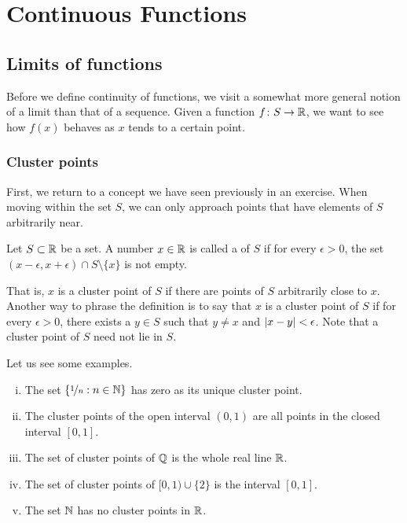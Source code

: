 \chapter{Continuous Functions} \label{lim:chapter}


\section{Limits of functions}
\label{sec:limoffunc}



Before we define continuity of functions, we visit a somewhat
more general notion of a limit than that of a sequence.
Given a function $f \colon S \to
{\mathbb{R}}$, we want to see how $f(x)$ behaves as $x$ tends to a certain point.

\subsection{Cluster points}

First,
we return to a concept we have seen previously in an exercise.
When moving within the set $S$, we can only approach points
that have elements of $S$ arbitrarily near.

\begin{defn}
Let $S \subset {\mathbb{R}}$ be a set.  A number $x \in {\mathbb{R}}$ is called
a \emph{} of $S$
if for every $\epsilon > 0$, the set $(x-\epsilon,x+\epsilon) \cap S
\setminus \{ x \}$ is not empty.
\end{defn}

That is, $x$ is a cluster point of $S$ if there are points of $S$
arbitrarily close to $x$.  Another way to phrase the definition is to say
that $x$ is a cluster point of $S$ if for every $\epsilon > 0$, there
exists a $y \in S$ such that $y \neq x$ and $\lvert {x - y} \rvert < \epsilon$.
Note that a cluster point of $S$ need not lie in $S$.

Let us see some examples.
\begin{enumerate}[(i)]
\item The set
$\{ \nicefrac{1}{n} : n \in {\mathbb{N}} \}$ has zero as its unique cluster point.
\item The cluster points of the open interval $(0,1)$ are
all points in the closed interval $[0,1]$.
\item
The set of cluster points of ${\mathbb{Q}}$ is the whole real line ${\mathbb{R}}$.
\item 
The set of cluster points of $[0,1) \cup \{ 2 \}$ is the interval $[0,1]$.
\item The set ${\mathbb{N}}$ has no cluster points in ${\mathbb{R}}$.
\end{enumerate}

